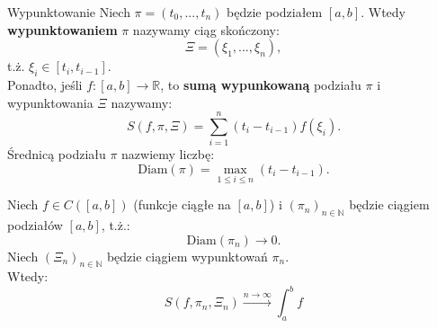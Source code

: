 \documentclass{article}
\numberwithin{defi}{section}
\numberwithin{defi}{section}
\newcommand{\R}{\mathbb{R}}
\newcommand{\N}{\mathbb{N}}
\newcommand{\oo}{\infty}
\newcommand{\przedz}[2]{[#1 _ {#2}, #1_{#2 - 1}]}
\renewcommand{\leq}{\leqslant}
\newcommand{\tb}[1]{\textbf{#1}}
\newcommand{\ciag}[1]{(#1_{n})_{n \in \N}}
\begin{document}
\begin{defr}{Wypunktowanie}
    Niech $\pi = (t_0, ..., t_n)$ będzie podziałem $[a, b]$. Wtedy \tb{wypunktowaniem} $\pi$ nazywamy ciąg skończony: \begin{equation}
        \Xi = (\xi_1, ..., \xi_n),
    \end{equation} t.ż. $\xi_i \in \przedz{t}{i}$. \\
    Ponadto, jeśli $f: [a, b] \to \R$, to \tb{sumą wypunkowaną} podziału $\pi$ i wypunktowania $\Xi$ nazywamy: \begin{equation}
        S(f, \pi, \Xi) = \sum_{i = 1}^{n} (t_i - t_{i- 1}) f(\xi_i).
    \end{equation} Średnicą podziału $\pi$ nazwiemy liczbę: \begin{equation}
        \text{Diam}(\pi) = \max_{1 \leq i \leq n} (t_i - t_{i-1}).
    \end{equation}
\end{defr}



\begin{twier}[label=twier:rozbicie-calki]{}
    Niech $f \in C([a, b])$ (funkcje ciągłe na $[a, b]$) i $\ciag{\pi}$ będzie ciągiem podziałów $[a, b]$, t.ż.:\begin{equation}
        \text{Diam}(\pi_n) \to 0.
    \end{equation} Niech $\ciag{\Xi}$ będzie ciągiem wypunktowań $\pi_n$. \\
    Wtedy: \begin{equation}
        S(f, \pi_n, \Xi_n) \xrightarrow[]{n \to \oo} \int_{a}^{b} f
    \end{equation}
\end{twier}
\end{document}
